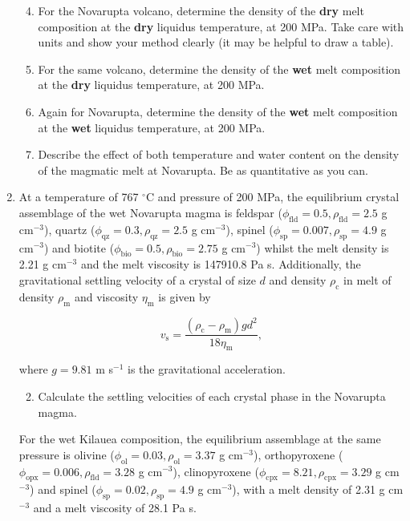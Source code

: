\documentclass[]{book}
\theoremstyle{definition}
\begin{document}
\begin{enumerate}
  \begin{enumerate}\setcounter{enumii}{3}
  \item For the Novarupta volcano, determine the density of the \textbf{dry} melt composition at the \textbf{dry} liquidus temperature, at 200 MPa. Take care with units and show your method clearly (it may be helpful to draw a table). 
  \item For the same volcano, determine the density of the \textbf{wet} melt composition at the \textbf{dry} liquidus temperature, at 200 MPa.
  \item Again for Novarupta, determine the density of the \textbf{wet} melt composition at the \textbf{wet} liquidus temperature, at 200 MPa.
  \item Describe the effect of both temperature and water content on the density of the magmatic melt at Novarupta. Be as quantitative as you can.
  \end{enumerate}


\item At a temperature of 767 $^{\circ}$C and pressure of 200 MPa, the equilibrium crystal assemblage of the wet Novarupta magma is feldspar ($\phi_{\text{fld}} = 0.5, \rho_{\text{fld}} = 2.5$ g cm$^{-3}$), quartz ($\phi_{\text{qz}} = 0.3, \rho_{\text{qz}} = 2.5$ g cm$^{-3}$), spinel ($\phi_{\text{sp}} = 0.007, \rho_{\text{sp}} = 4.9$ g cm$^{-3}$) and biotite ($\phi_{\text{bio}} = 0.5, \rho_{\text{bio}} = 2.75$ g cm$^{-3}$) whilst the melt density is 2.21 g cm$^{-3}$ and the melt viscosity is 147910.8 Pa s. Additionally, the gravitational settling velocity of a crystal of size $d$ and density $\rho_{\text{c}}$ in melt of density $\rho_{\text{m}}$ and viscosity $\eta_{\text{m}}$ is given by

  \begin{equation}
    \label{equ:Stokes}
    v_{\text{s}} = \frac{(\rho_{\text{c}} - \rho_{\text{m}}) g d^{2}}{18 \eta_{\text{m}}},
  \end{equation}

  where $g = 9.81$ m s$^{-1}$ is the gravitational acceleration. 

  \begin{enumerate}
    \setcounter{enumii}{1}
  \item Calculate the settling velocities of each crystal phase in the Novarupta magma.
  \end{enumerate}

  For the wet Kilauea composition, the equilibrium assemblage at the same pressure is olivine ($\phi_{\text{ol}} = 0.03, \rho_{\text{ol}} = 3.37$ g cm$^{-3}$), orthopyroxene ($\phi_{\text{opx}} = 0.006, \rho_{\text{fld}} = 3.28$ g cm$^{-3}$), clinopyroxene ($\phi_{\text{cpx}} = 8.21, \rho_{\text{cpx}} = 3.29$ g cm$^{-3}$) and spinel ($\phi_{\text{sp}} = 0.02, \rho_{\text{sp}} = 4.9$ g cm$^{-3}$), with a melt density of 2.31 g cm$^{-3}$ and a melt viscosity of 28.1 Pa s. 


\end{enumerate}
\end{document}
